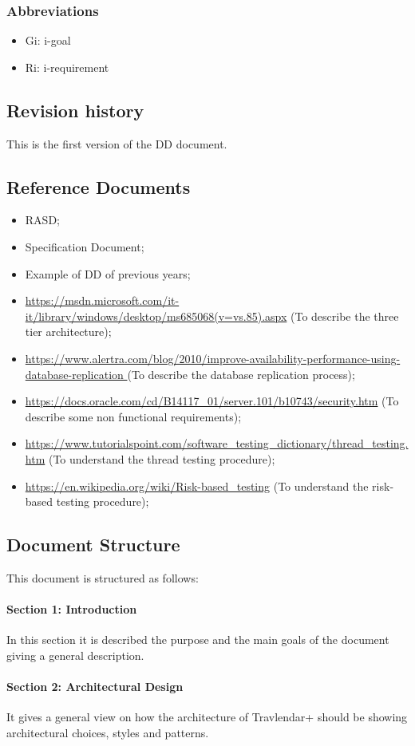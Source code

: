 \documentclass[12pt,titlepage]{article}
\begin{document}
\subsubsection{Abbreviations}
\begin{itemize}
\item	Gi: i-goal
\item	Ri: i-requirement
\end{itemize}
\subsection{Revision history}
This is the first version of the DD document.
\subsection{Reference Documents}
\begin{itemize}
\item RASD;
\item Specification Document;
\item Example of DD of previous years;
\item \url{https://msdn.microsoft.com/it-it/library/windows/desktop/ms685068(v=vs.85).aspx} (To describe the three tier architecture);
\item \url{https://www.alertra.com/blog/2010/improve-availability-performance-using-database-replication
} (To describe the database replication process);
\item \url{https://docs.oracle.com/cd/B14117_01/server.101/b10743/security.htm} (To describe some non functional requirements);
\item \url{https://www.tutorialspoint.com/software_testing_dictionary/thread_testing.htm} (To understand the thread testing procedure);
\item \url{https://en.wikipedia.org/wiki/Risk-based_testing} (To understand the risk-based testing procedure);
\end{itemize}
\subsection{Document Structure}
This document is structured as follows:
\paragraph{Section 1: Introduction}
In this section it is described the purpose and the main goals  of the document giving a general description.
\paragraph{Section 2: Architectural Design}
It gives a general view on how the architecture of Travlendar+ should be showing architectural choices, styles and patterns.
\end{document}
